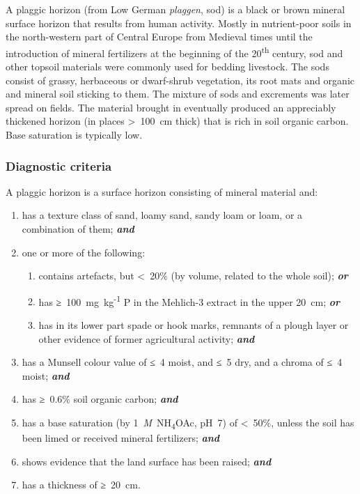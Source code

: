 \documentclass[
  letterpaper,
  DIV=11,
  numbers=noendperiod]{scrreprt}
\providecommand{\tightlist}{%
  \setlength{\itemsep}{0pt}\setlength{\parskip}{0pt}}\usepackage{longtable,booktabs,array}
\begin{document}
A plaggic horizon (from Low German \emph{plaggen}, sod) is a black or
brown mineral surface horizon that results from human activity. Mostly
in nutrient-poor soils in the north-western part of Central Europe from
Medieval times until the introduction of mineral fertilizers at the
beginning of the 20\textsuperscript{th} century, sod and other topsoil
materials were commonly used for bedding livestock. The sods consist of
grassy, herbaceous or dwarf-shrub vegetation, its root mats and organic
and mineral soil sticking to them. The mixture of sods and excrements
was later spread on fields. The material brought in eventually produced
an appreciably thickened horizon (in places \textgreater~100~cm thick)
that is rich in soil organic carbon. Base saturation is typically low.

\hypertarget{diagnostic-criteria-28}{%
\subsubsection{Diagnostic criteria}\label{diagnostic-criteria-28}}

A plaggic horizon is a surface horizon consisting of mineral material
and:

\begin{enumerate}
\def\labelenumi{\arabic{enumi}.}
\item
  has a texture class of sand, loamy sand, sandy loam or loam, or a
  combination of them; \textbf{\emph{and}}
\item
  one or more of the following:

  \begin{enumerate}
  \def\labelenumii{\alph{enumii}.}
  \tightlist
  \item
    contains artefacts, but \textless~20\% (by volume, related to the
    whole soil); \textbf{\emph{or}}
  \item
    has ≥~100~mg~kg\textsuperscript{-1} P in the Mehlich-3 extract in
    the upper 20~cm; \textbf{\emph{or}}
  \item
    has in its lower part spade or hook marks, remnants of a plough
    layer or other evidence of former agricultural activity;
    \textbf{\emph{and}}
  \end{enumerate}
\item
  has a Munsell colour value of ≤~4 moist, and ≤~5 dry, and a chroma of
  ≤~4 moist; \textbf{\emph{and}}
\item
  has ≥~0.6\% soil organic carbon; \textbf{\emph{and}}
\item
  has a base saturation (by 1~\emph{M}~NH\textsubscript{4}OAc, pH~7) of
  \textless~50\%, unless the soil has been limed or received mineral
  fertilizers; \textbf{\emph{and}}
\item
  shows evidence that the land surface has been raised;
  \textbf{\emph{and}}
\item
  has a thickness of ≥~20~cm.
\end{enumerate}
\end{document}
